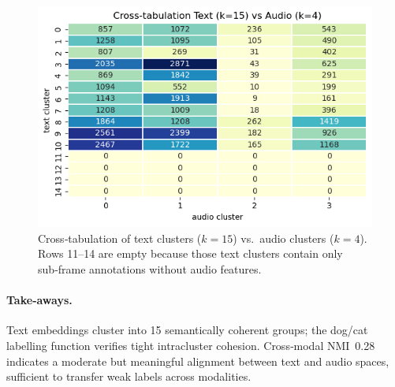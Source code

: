 \documentclass{article}
\begin{document}
\begin{figure}[h]
  \centering
  \includegraphics[width=.7\linewidth]{figs_tang/04_text_audio_heatmap_k15.png}
  \caption{Cross‑tabulation of text clusters ($k=15$) vs.\ audio clusters
           ($k=4$). Rows 11–14 are empty because those text clusters
           contain only sub‑frame annotations without audio features.}
  \label{fig:text_audio_heat}
\end{figure}

\paragraph{Take‑aways.}
Text embeddings cluster into 15 semantically coherent groups; the dog/cat
labelling function verifies tight intracluster cohesion.  
Cross‑modal NMI 0.28 indicates a moderate but meaningful alignment between
text and audio spaces, sufficient to transfer weak labels across modalities.

\end{document}
